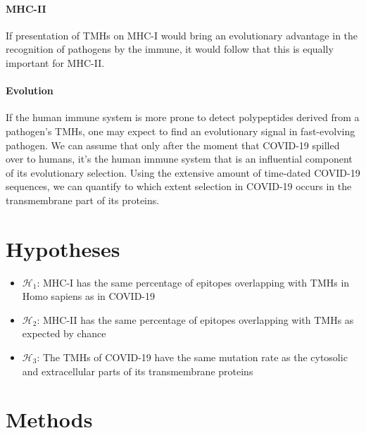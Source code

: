 \documentclass{article}
\begin{document}
\paragraph{MHC-II}

If presentation of TMHs on MHC-I would bring an evolutionary advantage 
in the recognition of pathogens by the immune, 
it would follow that this is equally important for MHC-II.

\paragraph{Evolution}

If the human immune system is more prone to detect polypeptides
derived from a pathogen's TMHs, one may expect to find an evolutionary
signal in fast-evolving pathogen. 
We can assume that only after the moment that COVID-19 spilled over 
to humans, it's the human immune system that is an influential component 
of its evolutionary selection.
Using the extensive amount of time-dated COVID-19 sequences,
we can quantify to which extent selection in COVID-19 occurs
in the transmembrane part of its proteins.

\section{Hypotheses}

\begin{itemize}
  \item $\mathcal{H}_1$: MHC-I has the same percentage of epitopes overlapping
    with TMHs in Homo sapiens as in COVID-19
  \item $\mathcal{H}_2$: MHC-II has the same percentage of epitopes overlapping
    with TMHs as expected by chance
  \item $\mathcal{H}_3$: The TMHs of COVID-19 have the same mutation rate 
    as the cytosolic and extracellular parts of its transmembrane proteins
\end{itemize}

\section{Methods}
\end{document}
